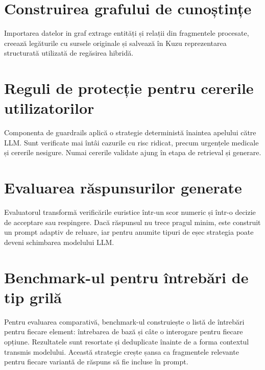 \documentclass[12pt, a4paper, oneside, romanian]{teza-upb}
\begin{document}
\label{anexa:qdrant-ingestion-pipeline}


\section{Construirea grafului de cunoștințe}

 Importarea datelor in graf extrage entități și relații din fragmentele procesate, creează legăturile cu sursele originale și salvează în Kuzu reprezentarea structurată utilizată de regăsirea hibridă.

\label{anexa:graph-ingestion}


\section{Reguli de protecție pentru cererile utilizatorilor}

Componenta de guardrails aplică o strategie deterministă înaintea apelului către LLM. Sunt verificate mai întâi cazurile cu risc ridicat, precum urgențele medicale și cererile nesigure. Numai cererile validate ajung în etapa de retrieval și generare.

\label{anexa:guardrail-rules}


\section{Evaluarea răspunsurilor generate}

Evaluatorul transformă verificările euristice într-un scor numeric și într-o decizie de acceptare sau respingere. Dacă răspunsul nu trece pragul minim, este construit un prompt adaptiv de reluare, iar pentru anumite tipuri de eșec strategia poate deveni schimbarea modelului LLM.

\label{anexa:evaluator-retry}


\section{Benchmark-ul pentru întrebări de tip grilă}

Pentru evaluarea comparativă, benchmark-ul construiește o listă de întrebări pentru fiecare element: întrebarea de bază și câte o interogare pentru fiecare opțiune. Rezultatele sunt resortate și deduplicate înainte de a forma contextul transmis modelului. Această strategie crește șansa ca fragmentele relevante pentru fiecare variantă de răspuns să fie incluse în prompt.
\end{document}
